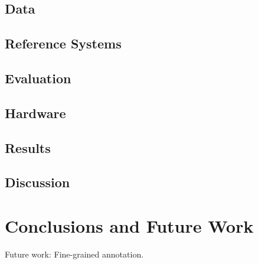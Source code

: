 \documentclass[11pt]{article}
\begin{document}
\subsection{Data}
\label{sec: data}

\subsection{Reference Systems}
\label{sec: reference systems}

\subsection{Evaluation}
\label{sec: evaluation}

\subsection{Hardware}
\label{sec: hardware}

\subsection{Results}
\label{sec: results}

\subsection{Discussion}
\label{sec: discussion}



\section{Conclusions and Future Work}
\label{sec: conclusions}


Future work: Fine-grained annotation.



\newpage

%

\end{document}
